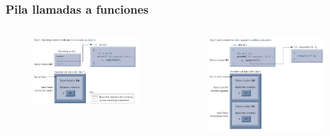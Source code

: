 \documentclass[10.5pt,scale=1.0,t,aspectratio=169,hyperref={pdfpagelabels=false}]{beamer}
\begin{document}
\begin{frame}
	\frametitle{Pila llamadas a funciones}
	\begin{columns}
		\begin{figure}
			\centering
			\includegraphics[scale=0.45]{Stack1}
		\end{figure}
	
		\begin{figure}
			\centering
			\includegraphics[scale=0.43]{Stack2}
		\end{figure}
	\end{columns}
\end{frame}
\end{document}
